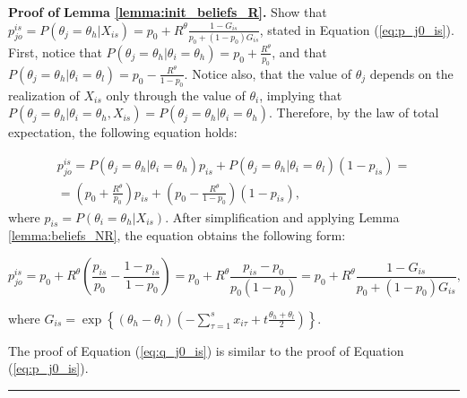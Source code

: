 \documentclass[12pt]{article}
\newenvironment{proof}[1][Proof of]{\noindent\textbf{#1} }{\ \rule{0.5em}{0.5em}}
\begin{document}
\begin{proof}
    \textbf{Lemma \ref{lemma:init_beliefs_R}.}
Show that \(p_{jo}^{is} = P(\theta_j = \theta_h | X_{is}) = p_0 + R^\theta \frac{1-G_{is}}{p_0 + (1-p_0)G_{is}}\), stated in Equation (\ref{eq:p_j0_is}). First, notice that \(P( \theta_j = \theta_h | \theta_i = \theta_h ) = p_0 + \frac{R^\theta}{p_0}\), and that \(P( \theta_j = \theta_h | \theta_i = \theta_l ) = p_0 - \frac{R^\theta}{1-p_0}\). Notice also, that the value of \(\theta_j\) depends on the realization of \(X_{is}\) only through the value of \(\theta_i\), implying that \(P( \theta_j = \theta_h | \theta_i = \theta_h, X_{is} ) = P( \theta_j = \theta_h | \theta_i = \theta_h )\). Therefore, by the law of total expectation, the following equation holds:

\begin{equation*}
    \begin{aligned}
        p_{jo}^{is} = P( \theta_j = \theta_h | \theta_i = \theta_h) p_{is} + P( \theta_j = \theta_h | \theta_i = \theta_l) (1-p_{is}) =
        \\
        =\left(p_0 + \frac{R^\theta}{p_0}\right)p_{is} + \left(p_0 - \frac{R^\theta}{1-p_0}\right)(1-p_{is}), 
    \end{aligned}
\end{equation*}
where \(p_{is} = P(\theta_i = \theta_h | X_{is})\). After simplification and applying Lemma \ref{lemma:beliefs_NR}, the equation obtains the following form:

\[
p_{jo}^{is} = p_0 + R^\theta\left( \frac{p_{is}}{p_0}-\frac{1-p_{is}}{1-p_0}\right) = p_0 + R^\theta\frac{p_{is}-p_0}{p_0(1-p_0)} = p_0 + R^\theta\frac{1-G_{is}}{p_0 + (1-p_0)G_{is}},
\]

where \(G_{is} = \exp \left\lbrace \left(\theta_h - \theta_l\right)\left(-\sum_{\tau = 1}^{s} x_{i\tau} + t\frac{\theta_h + \theta_l}{2}\right)\right\rbrace\).

The proof of Equation (\ref{eq:q_j0_is}) is similar to the proof of Equation (\ref{eq:p_j0_is}).
\end{proof}
\end{document}
